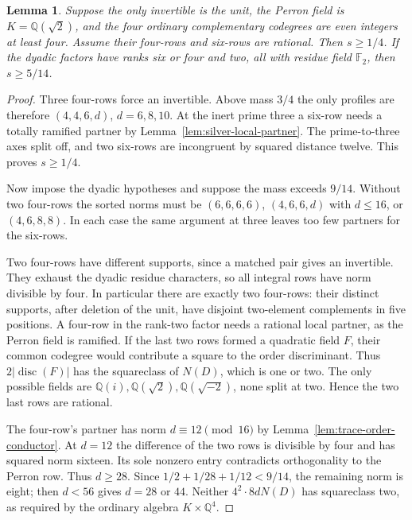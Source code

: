 \documentclass[11pt,reqno]{amsart}
\newtheorem{lemma}[theorem]{Lemma}
\theoremstyle{remark}\newtheorem{remark}[theorem]{Remark}
\numberwithin{equation}{section}
\begin{document}
\begin{lemma}\label{lem:silver-no-invertible-mass}
Suppose the only invertible is the unit, the Perron field is
$K=\mathbb Q(\sqrt2)$, and the four ordinary complementary codegrees
are even integers at least four. Assume their four-rows and six-rows
are rational. Then $s\ge1/4$. If the dyadic factors have ranks six or four and two,
all with residue field $\mathbb F_2$, then $s\ge5/14$.
\end{lemma}
\begin{proof}
Three four-rows force an invertible. Above mass $3/4$ the only
profiles are therefore $(4,4,6,d)$, $d=6,8,10$. At the inert
prime three a six-row needs a totally ramified partner by
Lemma~\ref{lem:silver-local-partner}. The prime-to-three axes split
off, and two six-rows are incongruent by squared distance twelve.
This proves $s\ge1/4$.

Now impose the dyadic hypotheses and suppose the mass exceeds $9/14$.
Without two four-rows
the sorted norms must be $(6,6,6,6)$, $(4,6,6,d)$ with $d\le16$,
or $(4,6,8,8)$. In each case the same argument at three leaves too few partners for the six-rows.

Two four-rows have different supports, since a matched pair gives
an invertible. They exhaust the dyadic residue characters, so all
integral rows have norm divisible by four. In particular there are
exactly two four-rows: their distinct supports, after deletion of
the unit, have disjoint two-element complements in five positions.
A four-row in the rank-two factor needs a rational local partner,
as the Perron field is ramified. If the last two rows formed a
quadratic field $F$, their common codegree would contribute a square
to the order discriminant. Thus $2|\operatorname{disc}(F)|$ has
the squareclass of $N(D)$, which is one or two. The only possible
fields are $\mathbb Q(i),\mathbb Q(\sqrt2),\mathbb Q(\sqrt{-2})$,
none split at two. Hence the two last rows are rational.

The four-row's partner has norm $d\equiv12\pmod{16}$ by
Lemma~\ref{lem:trace-order-conductor}. At $d=12$ the difference
of the two rows is divisible by four and has squared norm sixteen.
Its sole nonzero entry contradicts orthogonality to the Perron row.
Thus $d\ge28$. Since $1/2+1/28+1/12<9/14$, the remaining norm
is eight; then $d<56$ gives $d=28$ or $44$. Neither
$4^2\cdot8d N(D)$ has squareclass two, as required by the ordinary
algebra $K\times\mathbb Q^4$.
\end{proof}
\end{document}
